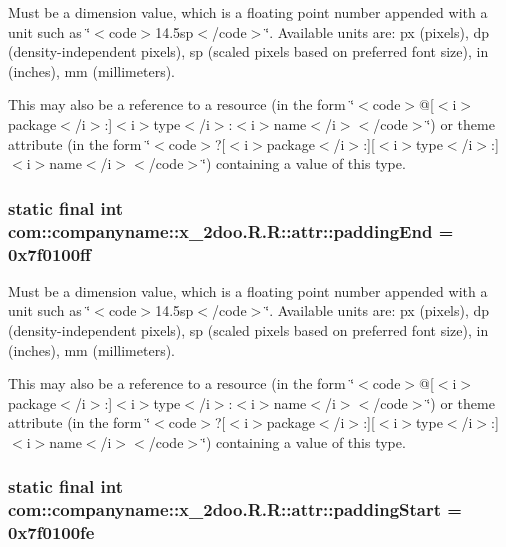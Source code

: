 Must be a dimension value, which is a floating point number appended with a unit such as \char`\"{}$<$code$>$14.5sp$<$/code$>$\char`\"{}. Available units are: px (pixels), dp (density-independent pixels), sp (scaled pixels based on preferred font size), in (inches), mm (millimeters). 

This may also be a reference to a resource (in the form \char`\"{}$<$code$>$@\mbox{[}$<$i$>$package$<$/i$>$:\mbox{]}$<$i$>$type$<$/i$>$:$<$i$>$name$<$/i$>$$<$/code$>$\char`\"{}) or theme attribute (in the form \char`\"{}$<$code$>$?\mbox{[}$<$i$>$package$<$/i$>$:\mbox{]}\mbox{[}$<$i$>$type$<$/i$>$:\mbox{]}$<$i$>$name$<$/i$>$$<$/code$>$\char`\"{}) containing a value of this type. \hypertarget{classcom_1_1companyname_1_1x__2doo_1_1_r_1_1attr_e008b68b7e8d36c17ebcdf24959ffed6}{
\subsubsection[{paddingEnd}]{\setlength{\rightskip}{0pt plus 5cm}static final int com::companyname::x\_\-2doo.R.R::attr::paddingEnd = 0x7f0100ff}}
\label{classcom_1_1companyname_1_1x__2doo_1_1_r_1_1attr_e008b68b7e8d36c17ebcdf24959ffed6}


Must be a dimension value, which is a floating point number appended with a unit such as \char`\"{}$<$code$>$14.5sp$<$/code$>$\char`\"{}. Available units are: px (pixels), dp (density-independent pixels), sp (scaled pixels based on preferred font size), in (inches), mm (millimeters). 

This may also be a reference to a resource (in the form \char`\"{}$<$code$>$@\mbox{[}$<$i$>$package$<$/i$>$:\mbox{]}$<$i$>$type$<$/i$>$:$<$i$>$name$<$/i$>$$<$/code$>$\char`\"{}) or theme attribute (in the form \char`\"{}$<$code$>$?\mbox{[}$<$i$>$package$<$/i$>$:\mbox{]}\mbox{[}$<$i$>$type$<$/i$>$:\mbox{]}$<$i$>$name$<$/i$>$$<$/code$>$\char`\"{}) containing a value of this type. \hypertarget{classcom_1_1companyname_1_1x__2doo_1_1_r_1_1attr_7ef8bbd25f69aed02cc2af6d0ca7cb2c}{
\subsubsection[{paddingStart}]{\setlength{\rightskip}{0pt plus 5cm}static final int com::companyname::x\_\-2doo.R.R::attr::paddingStart = 0x7f0100fe}}
\label{classcom_1_1companyname_1_1x__2doo_1_1_r_1_1attr_7ef8bbd25f69aed02cc2af6d0ca7cb2c}


